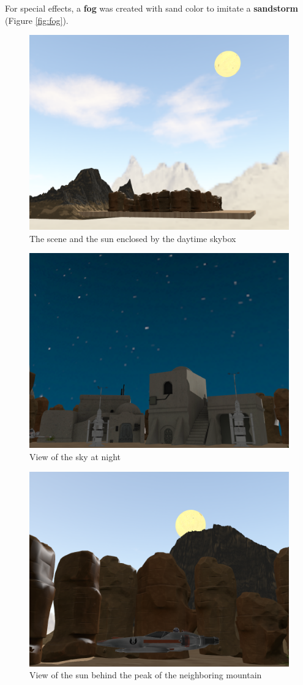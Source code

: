 For special effects, a \textbf{fog} was created with sand color to imitate a \textbf{sandstorm} (Figure \ref{fig:fog}).

\begin{figure}
    \centering
    \includegraphics[width=.75\linewidth]{img/skybox_day.png}
    \caption{The scene and the sun enclosed by the daytime skybox}
    \label{fig:skybox_day}
\end{figure}

\begin{figure}
    \centering
    \includegraphics[width=.75\linewidth]{img/skybox_night.png}
    \caption{View of the sky at night}
    \label{fig:skybox_night}
\end{figure}

\begin{figure}
    \centering
    \includegraphics[width=.75\linewidth]{img/rock.png}
    \caption{View of the sun behind the peak of the neighboring mountain}
    \label{fig:rock}
\end{figure}

